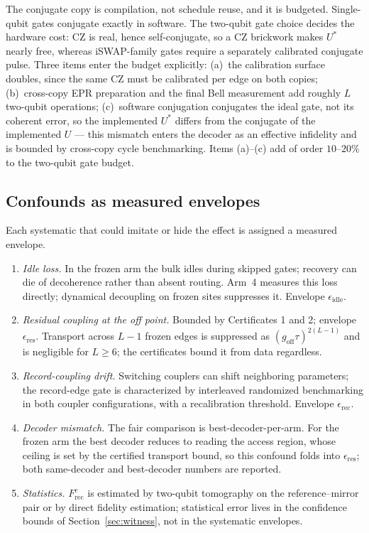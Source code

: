 \documentclass[11pt]{article}
\newcommand{\Frec}{F^{e}_{\mathrm{rec}}}
\begin{document}
The conjugate copy is compilation, not schedule reuse, and it is
budgeted.  Single-qubit gates conjugate exactly in software.  The
two-qubit gate choice decides the hardware cost: CZ is real, hence
self-conjugate, so a CZ brickwork makes $U^*$ nearly free, whereas
iSWAP-family gates require a separately calibrated conjugate pulse.
Three items enter the budget explicitly: (a)~the calibration surface
doubles, since the same CZ must be calibrated per edge on both
copies; (b)~cross-copy EPR preparation and the final Bell
measurement add roughly $L$ two-qubit operations; (c)~software
conjugation conjugates the ideal gate, not its coherent error, so the
implemented $U^*$ differs from the conjugate of the implemented $U$
--- this mismatch enters the decoder as an effective infidelity and
is bounded by cross-copy cycle benchmarking.  Items (a)--(c) add of
order $10$--$20\%$ to the two-qubit gate budget.

\subsection{Confounds as measured envelopes}
\label{sec:confounds}

Each systematic that could imitate or hide the effect is assigned a
measured envelope.

\begin{enumerate}
\item \emph{Idle loss.}  In the frozen arm the bulk idles during
  skipped gates; recovery can die of decoherence rather than absent
  routing.  Arm~4 measures this loss directly; dynamical decoupling
  on frozen sites suppresses it.  Envelope
  $\epsilon_{\mathrm{idle}}$.
\item \emph{Residual coupling at the off point.}  Bounded by
  Certificates 1 and 2; envelope $\epsilon_{\mathrm{res}}$.
  Transport across $L-1$ frozen edges is suppressed as
  $(g_{\mathrm{off}}\tau)^{2(L-1)}$ and is negligible for
  $L \ge 6$; the certificates bound it from data regardless.
\item \emph{Record-coupling drift.}  Switching couplers can shift
  neighboring parameters; the record-edge gate is characterized by
  interleaved randomized benchmarking in both coupler
  configurations, with a recalibration threshold.  Envelope
  $\epsilon_{\mathrm{rec}}$.
\item \emph{Decoder mismatch.}  The fair comparison is
  best-decoder-per-arm.  For the frozen arm the best decoder reduces
  to reading the access region, whose ceiling is set by the
  certified transport bound, so this confound folds into
  $\epsilon_{\mathrm{res}}$; both same-decoder and best-decoder
  numbers are reported.
\item \emph{Statistics.}  $\Frec$ is estimated by two-qubit
  tomography on the reference--mirror pair or by direct fidelity
  estimation; statistical error lives in the confidence bounds of
  Section~\ref{sec:witness}, not in the systematic envelopes.
\end{enumerate}
\end{document}
